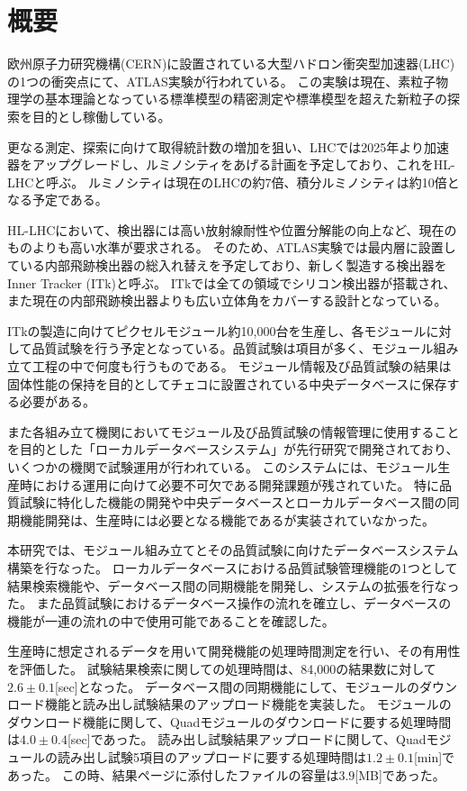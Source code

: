 \chapter*{概要}

欧州原子力研究機構(CERN)に設置されている大型ハドロン衝突型加速器(LHC)の1つの衝突点にて、ATLAS実験が行われている。
この実験は現在、素粒子物理学の基本理論となっている標準模型の精密測定や標準模型を超えた新粒子の探索を目的とし稼働している。

更なる測定、探索に向けて取得統計数の増加を狙い、LHCでは2025年より加速器をアップグレードし、ルミノシティをあげる計画を予定しており、これをHL-LHCと呼ぶ。
ルミノシティは現在のLHCの約7倍、積分ルミノシティは約10倍となる予定である。

HL-LHCにおいて、検出器には高い放射線耐性や位置分解能の向上など、現在のものよりも高い水準が要求される。
そのため、ATLAS実験では最内層に設置している内部飛跡検出器の総入れ替えを予定しており、新しく製造する検出器をInner Tracker (ITk)と呼ぶ。
ITkでは全ての領域でシリコン検出器が搭載され、また現在の内部飛跡検出器よりも広い立体角をカバーする設計となっている。

ITkの製造に向けてピクセルモジュール約10,000台を生産し、各モジュールに対して品質試験を行う予定となっている。品質試験は項目が多く、モジュール組み立て工程の中で何度も行うものである。
モジュール情報及び品質試験の結果は固体性能の保持を目的としてチェコに設置されている中央データベースに保存する必要がある。

また各組み立て機関においてモジュール及び品質試験の情報管理に使用することを目的とした「ローカルデータベースシステム」が先行研究で開発されており、いくつかの機関で試験運用が行われている。
このシステムには、モジュール生産時における運用に向けて必要不可欠である開発課題が残されていた。
特に品質試験に特化した機能の開発や中央データベースとローカルデータベース間の同期機能開発は、生産時には必要となる機能であるが実装されていなかった。

本研究では、モジュール組み立てとその品質試験に向けたデータベースシステム構築を行なった。
ローカルデータベースにおける品質試験管理機能の1つとして結果検索機能や、データベース間の同期機能を開発し、システムの拡張を行なった。
また品質試験におけるデータベース操作の流れを確立し、データベースの機能が一連の流れの中で使用可能であることを確認した。

生産時に想定されるデータを用いて開発機能の処理時間測定を行い、その有用性を評価した。
試験結果検索に関しての処理時間は、84,000の結果数に対して$2.6\pm 0.1$[sec]となった。
データベース間の同期機能にして、モジュールのダウンロード機能と読み出し試験結果のアップロード機能を実装した。
モジュールのダウンロード機能に関して、Quadモジュールのダウンロードに要する処理時間は$4.0\pm 0.4$[sec]であった。
読み出し試験結果アップロードに関して、Quadモジュールの読み出し試験5項目のアップロードに要する処理時間は$1.2\pm 0.1$[min]であった。
この時、結果ページに添付したファイルの容量は$3.9$[MB]であった。



